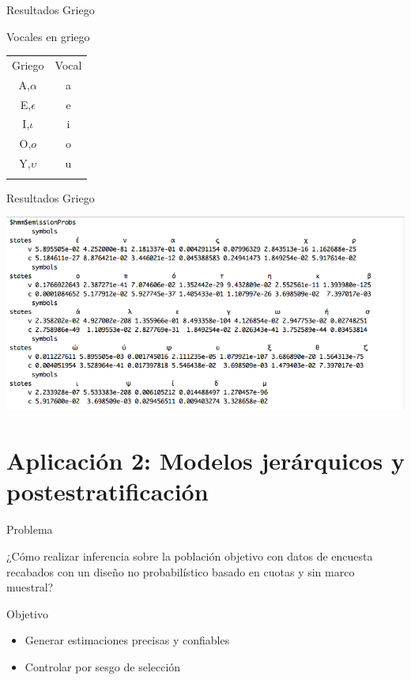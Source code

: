 \documentclass[ignorenonframetext,]{beamer}
\begin{document}
\begin{frame}{Resultados Griego}

Vocales en griego

\begin{longtable}[c]{@{}cc@{}}
\toprule\addlinespace
Griego & Vocal
\\\addlinespace
\midrule\endhead
A,$\alpha$ & a
\\\addlinespace
E,$\epsilon$ & e
\\\addlinespace
I,$\iota$ & i
\\\addlinespace
O,$o$ & o
\\\addlinespace
Y,$\upsilon$ & u
\\\addlinespace
\bottomrule
\end{longtable}

\end{frame}

\begin{frame}{Resultados Griego}

\includegraphics{../hmm/salida_vocales_griego.png}

\end{frame}

\section{Aplicación 2: Modelos jerárquicos y
postestratificación}\label{aplicacion-2-modelos-jerarquicos-y-postestratificacion}

\begin{frame}{Problema}

¿Cómo realizar inferencia sobre la población objetivo con datos de
encuesta recabados con un diseño no probabilístico basado en cuotas y
sin marco muestral?

\begin{block}{Objetivo}

\begin{itemize}
\itemsep1pt\parskip0pt
\item
  Generar estimaciones precisas y confiables
\item
  Controlar por sesgo de selección
\end{itemize}

\end{block}

\end{frame}
\end{document}
